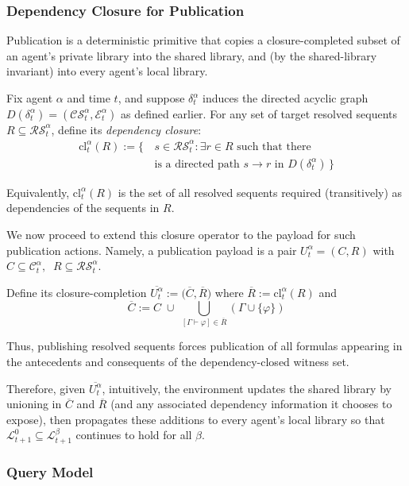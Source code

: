 \documentclass[letterpaper]{article} %
\renewcommand{\phi}{\varphi}
\newcommand{\proves}{\vdash}
\begin{document}
\subsubsection{Dependency Closure for Publication}

Publication is a deterministic primitive that copies a closure-completed subset of an agent's private library
into the shared library, and (by the shared-library invariant) into every agent's local library.

Fix agent $\alpha$ and time $t$, and suppose $\delta_t^\alpha$ induces the directed acyclic graph
$D(\delta_t^\alpha)=(\mathcal{CS}_t^\alpha,\mathcal{E}_t^\alpha)$ as defined earlier.
For any set of target resolved sequents $R\subseteq \mathcal{RS}_t^\alpha$, define its \emph{dependency closure}:
\begin{align*}
\mathrm{cl}^{\alpha}_t(R) := 
\Big\{\, &s\in \mathcal{RS}_t^\alpha : \exists r\in R \text{ such that there}\\& \text{is a directed path } s\to r
\text{ in } D(\delta_t^\alpha)\,\Big\}
\end{align*}

Equivalently, $\mathrm{cl}^\alpha_t(R)$ is the set of all resolved sequents required (transitively) as dependencies
of the sequents in $R$.


We now proceed to extend this closure operator to the payload for such publication actions. Namely, a publication payload is a pair $U_t^\alpha=(C,R)$ with $C\subseteq \mathcal{C}_t^\alpha,\;\; R\subseteq \mathcal{RS}_t^\alpha$.

Define its closure-completion $\overline{U_t^\alpha}:=\big(\overline{C},\overline{R}\big)$ where $\overline{R}:=\mathrm{cl}^\alpha_t(R)$ and
\[\overline{C}:= C \;\cup\; \bigcup_{[\Gamma\proves\phi]\in \overline{R}}(\Gamma\cup\{\phi\})\]

Thus, publishing resolved sequents forces publication of all formulas appearing in the antecedents and consequents of the dependency-closed witness set.


Therefore, given $\overline{U_t^\alpha}$, intuitively, the environment updates the shared library by unioning in $\overline{C}$ and $\overline{R}$ (and any associated dependency information it chooses to expose),
then propagates these additions to every agent's local library so that $\mathcal{L}^0_{t+1}\subseteq \mathcal{L}^\beta_{t+1}$
continues to hold for all $\beta$.



\subsubsection{Query Model}
\end{document}
